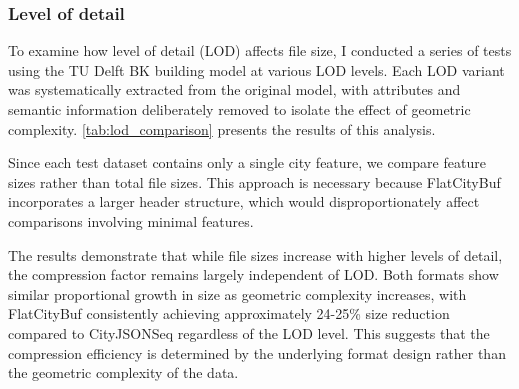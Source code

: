 \subsubsection{Level of detail}
\label{result:overview:analysis_of_file_size_results:level_of_detail}

To examine how level of detail (LOD) affects file size, I conducted a series of tests using the TU Delft BK building model at various LOD levels. Each LOD variant was systematically extracted from the original model, with attributes and semantic information deliberately removed to isolate the effect of geometric complexity. \autoref{tab:lod_comparison} presents the results of this analysis.

Since each test dataset contains only a single city feature, we compare feature sizes rather than total file sizes. This approach is necessary because FlatCityBuf incorporates a larger header structure, which would disproportionately affect comparisons involving minimal features.

The results demonstrate that while file sizes increase with higher levels of detail, the compression factor remains largely independent of LOD. Both formats show similar proportional growth in size as geometric complexity increases, with FlatCityBuf consistently achieving approximately 24-25\% size reduction compared to CityJSONSeq regardless of the LOD level. This suggests that the compression efficiency is determined by the underlying format design rather than the geometric complexity of the data.

